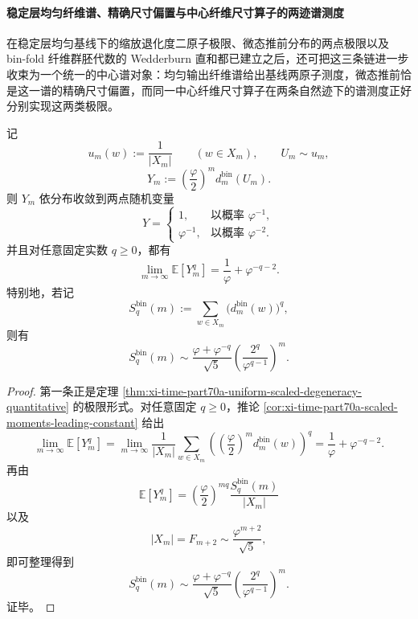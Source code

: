 \paragraph{稳定层均匀纤维谱、精确尺寸偏置与中心纤维尺寸算子的两迹谱测度}
在稳定层均匀基线下的缩放退化度二原子极限、微态推前分布的两点极限以及 bin-fold 纤维群胚代数的 Wedderburn 直和都已建立之后，还可把这三条链进一步收束为一个统一的中心谱对象：均匀输出纤维谱给出基线两原子测度，微态推前恰是这一谱的精确尺寸偏置，而同一中心纤维尺寸算子在两条自然迹下的谱测度正好分别实现这两类极限。

\begin{theorem}\label{thm:xi-time-part60ab4-uniform-fiber-spectrum-twoatom-moment-closure}
记
\[
u_m(w):=\frac{1}{|X_m|}
\qquad (w\in X_m),
\qquad
U_m\sim u_m,
\]
\[
Y_m:=\left(\frac{\varphi}{2}\right)^m d_m^{\mathrm{bin}}(U_m).
\]
则 \(Y_m\) 依分布收敛到两点随机变量
\[
Y=
\begin{cases}
1, & \text{以概率 } \varphi^{-1},\\[3pt]
\varphi^{-1}, & \text{以概率 } \varphi^{-2}.
\end{cases}
\]
并且对任意固定实数 \(q\ge 0\)，都有
\[
\lim_{m\to\infty}\mathbb E[Y_m^q]
=
\frac{1}{\varphi}+\varphi^{-q-2}.
\]
特别地，若记
\[
S_q^{\mathrm{bin}}(m):=\sum_{w\in X_m}\bigl(d_m^{\mathrm{bin}}(w)\bigr)^q,
\]
则有
\[
S_q^{\mathrm{bin}}(m)
\sim
\frac{\varphi+\varphi^{-q}}{\sqrt5}
\left(\frac{2^q}{\varphi^{q-1}}\right)^m.
\]
\end{theorem}
\begin{proof}
第一条正是定理 \ref{thm:xi-time-part70a-uniform-scaled-degeneracy-quantitative} 的极限形式。对任意固定 \(q\ge 0\)，推论 \ref{cor:xi-time-part70a-scaled-moments-leading-constant} 给出
\[
\lim_{m\to\infty}\mathbb E[Y_m^q]
=
\lim_{m\to\infty}
\frac{1}{|X_m|}
\sum_{w\in X_m}
\left(
\left(\frac{\varphi}{2}\right)^m d_m^{\mathrm{bin}}(w)
\right)^q
=
\frac{1}{\varphi}+\varphi^{-q-2}.
\]
再由
\[
\mathbb E[Y_m^q]
=
\left(\frac{\varphi}{2}\right)^{mq}\frac{S_q^{\mathrm{bin}}(m)}{|X_m|}
\]
以及
\[
|X_m|=F_{m+2}\sim \frac{\varphi^{m+2}}{\sqrt5},
\]
即可整理得到
\[
S_q^{\mathrm{bin}}(m)
\sim
\frac{\varphi+\varphi^{-q}}{\sqrt5}
\left(\frac{2^q}{\varphi^{q-1}}\right)^m.
\]
证毕。
\end{proof}

